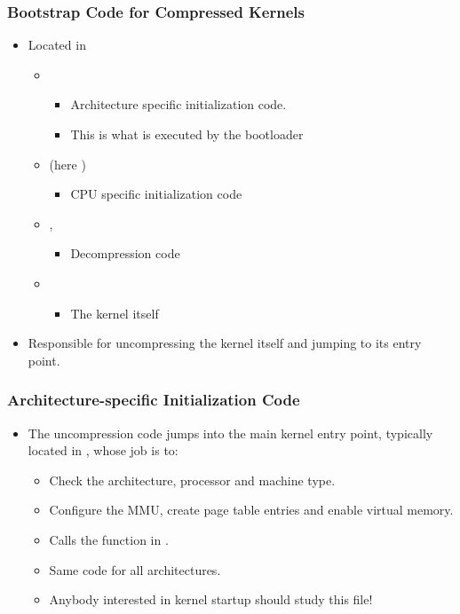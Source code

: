 \begin{frame}
  \frametitle{Bootstrap Code for Compressed Kernels}
  \begin{itemize}
  \item Located in 
    \begin{itemize}
    \item {}
      \begin{itemize}
      \item Architecture specific initialization code.
      \item This is what is executed by the bootloader
      \end{itemize}
    \item {} (here )
      \begin{itemize}
      \item CPU specific initialization code
      \end{itemize}
    \item {}, 
      \begin{itemize}
      \item Decompression code
      \end{itemize}
    \item {}
      \begin{itemize}
      \item The kernel itself
      \end{itemize}
    \end{itemize}
  \item Responsible for uncompressing the kernel itself and jumping to
    its entry point.
  \end{itemize}
\end{frame}

\begin{frame}
  \frametitle{Architecture-specific Initialization Code}
  \begin{itemize}
  \item The uncompression code jumps into the main kernel entry point,
    typically located in , whose job
    is to:
    \begin{itemize}
    \item Check the architecture, processor and machine type.
    \item Configure the MMU, create page table entries and enable
      virtual memory.
    \item Calls the  function in
      .
    \item Same code for all architectures.
    \item Anybody interested in kernel startup should study this file!
    \end{itemize}
  \end{itemize}
\end{frame}

